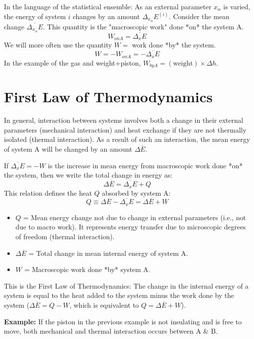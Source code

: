 \documentclass[11pt]{article}
\newcommand{\avg}[1]{\overline{#1}}
\begin{document}
In the language of the statistical ensemble:
As an external parameter $x_\alpha$ is varied, the energy of system $i$ changes by an amount $\Delta_{x_\alpha} E^{(i)}$.
Consider the mean change $\avg{\Delta_{x_\alpha} E}$. This quantity is the "macroscopic work" done *on* the system A.
\[ W_{on A} = \avg{\Delta_x E} \]
We will more often use the quantity $W =$ work done *by* the system.
\[ W = -W_{on A} = -\avg{\Delta_x E} \]
In the example of the gas and weight+piston, $W_{by A} = (\text{weight}) \times \Delta h$.

\section*{First Law of Thermodynamics}

In general, interaction between systems involves both a change in their external parameters (mechanical interaction) and heat exchange if they are not thermally isolated (thermal interaction).
As a result of such an interaction, the mean energy of system A will be changed by an amount $\Delta \avg{E}$.

If $\avg{\Delta_x E} = -W$ is the increase in mean energy from macroscopic work done *on* the system, then we write the total change in energy as:
\[ \Delta \avg{E} = \avg{\Delta_x E} + Q \]
This relation defines the heat $Q$ absorbed by system A:
\[ Q \equiv \Delta \avg{E} - \avg{\Delta_x E} = \Delta \avg{E} + W \]

\begin{itemize}
    \item $Q$ = Mean energy change not due to change in external parameters (i.e., not due to macro work). It represents energy transfer due to microscopic degrees of freedom (thermal interaction).
    \item $\Delta \avg{E}$ = Total change in mean internal energy of system A.
    \item $W$ = Macroscopic work done *by* system A.
\end{itemize}
This is the First Law of Thermodynamics: The change in the internal energy of a system is equal to the heat added to the system minus the work done by the system ($\Delta \avg{E} = Q - W$, which is equivalent to $Q = \Delta \avg{E} + W$).

\textbf{Example:} If the piston in the previous example is not insulating and is free to move, both mechanical and thermal interaction occurs between A \& B.
\end{document}
